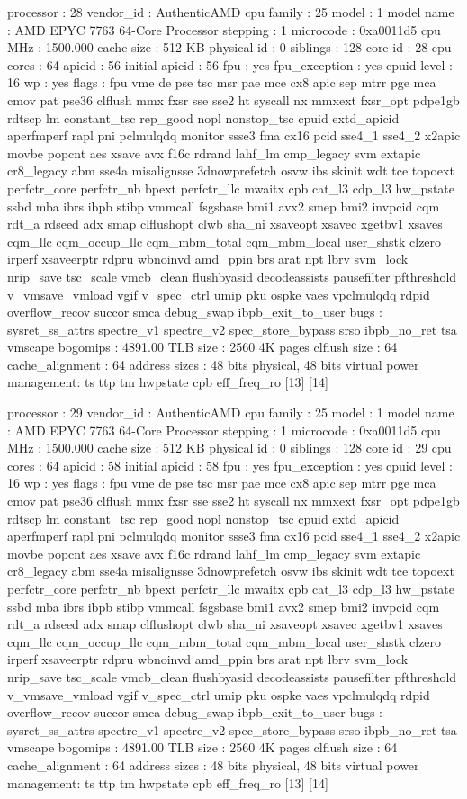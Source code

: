 processor	: 28
vendor_id	: AuthenticAMD
cpu family	: 25
model		: 1
model name	: AMD EPYC 7763 64-Core Processor
stepping	: 1
microcode	: 0xa0011d5
cpu MHz		: 1500.000
cache size	: 512 KB
physical id	: 0
siblings	: 128
core id		: 28
cpu cores	: 64
apicid		: 56
initial apicid	: 56
fpu		: yes
fpu_exception	: yes
cpuid level	: 16
wp		: yes
flags		: fpu vme de pse tsc msr pae mce cx8 apic sep mtrr pge mca cmov pat pse36 clflush mmx fxsr sse sse2 ht syscall nx mmxext fxsr_opt pdpe1gb rdtscp lm constant_tsc rep_good nopl nonstop_tsc cpuid extd_apicid aperfmperf rapl pni pclmulqdq monitor ssse3 fma cx16 pcid sse4_1 sse4_2 x2apic movbe popcnt aes xsave avx f16c rdrand lahf_lm cmp_legacy svm extapic cr8_legacy abm sse4a misalignsse 3dnowprefetch osvw ibs skinit wdt tce topoext perfctr_core perfctr_nb bpext perfctr_llc mwaitx cpb cat_l3 cdp_l3 hw_pstate ssbd mba ibrs ibpb stibp vmmcall fsgsbase bmi1 avx2 smep bmi2 invpcid cqm rdt_a rdseed adx smap clflushopt clwb sha_ni xsaveopt xsavec xgetbv1 xsaves cqm_llc cqm_occup_llc cqm_mbm_total cqm_mbm_local user_shstk clzero irperf xsaveerptr rdpru wbnoinvd amd_ppin brs arat npt lbrv svm_lock nrip_save tsc_scale vmcb_clean flushbyasid decodeassists pausefilter pfthreshold v_vmsave_vmload vgif v_spec_ctrl umip pku ospke vaes vpclmulqdq rdpid overflow_recov succor smca debug_swap ibpb_exit_to_user
bugs		: sysret_ss_attrs spectre_v1 spectre_v2 spec_store_bypass srso ibpb_no_ret tsa vmscape
bogomips	: 4891.00
TLB size	: 2560 4K pages
clflush size	: 64
cache_alignment	: 64
address sizes	: 48 bits physical, 48 bits virtual
power management: ts ttp tm hwpstate cpb eff_freq_ro [13] [14]

processor	: 29
vendor_id	: AuthenticAMD
cpu family	: 25
model		: 1
model name	: AMD EPYC 7763 64-Core Processor
stepping	: 1
microcode	: 0xa0011d5
cpu MHz		: 1500.000
cache size	: 512 KB
physical id	: 0
siblings	: 128
core id		: 29
cpu cores	: 64
apicid		: 58
initial apicid	: 58
fpu		: yes
fpu_exception	: yes
cpuid level	: 16
wp		: yes
flags		: fpu vme de pse tsc msr pae mce cx8 apic sep mtrr pge mca cmov pat pse36 clflush mmx fxsr sse sse2 ht syscall nx mmxext fxsr_opt pdpe1gb rdtscp lm constant_tsc rep_good nopl nonstop_tsc cpuid extd_apicid aperfmperf rapl pni pclmulqdq monitor ssse3 fma cx16 pcid sse4_1 sse4_2 x2apic movbe popcnt aes xsave avx f16c rdrand lahf_lm cmp_legacy svm extapic cr8_legacy abm sse4a misalignsse 3dnowprefetch osvw ibs skinit wdt tce topoext perfctr_core perfctr_nb bpext perfctr_llc mwaitx cpb cat_l3 cdp_l3 hw_pstate ssbd mba ibrs ibpb stibp vmmcall fsgsbase bmi1 avx2 smep bmi2 invpcid cqm rdt_a rdseed adx smap clflushopt clwb sha_ni xsaveopt xsavec xgetbv1 xsaves cqm_llc cqm_occup_llc cqm_mbm_total cqm_mbm_local user_shstk clzero irperf xsaveerptr rdpru wbnoinvd amd_ppin brs arat npt lbrv svm_lock nrip_save tsc_scale vmcb_clean flushbyasid decodeassists pausefilter pfthreshold v_vmsave_vmload vgif v_spec_ctrl umip pku ospke vaes vpclmulqdq rdpid overflow_recov succor smca debug_swap ibpb_exit_to_user
bugs		: sysret_ss_attrs spectre_v1 spectre_v2 spec_store_bypass srso ibpb_no_ret tsa vmscape
bogomips	: 4891.00
TLB size	: 2560 4K pages
clflush size	: 64
cache_alignment	: 64
address sizes	: 48 bits physical, 48 bits virtual
power management: ts ttp tm hwpstate cpb eff_freq_ro [13] [14]

